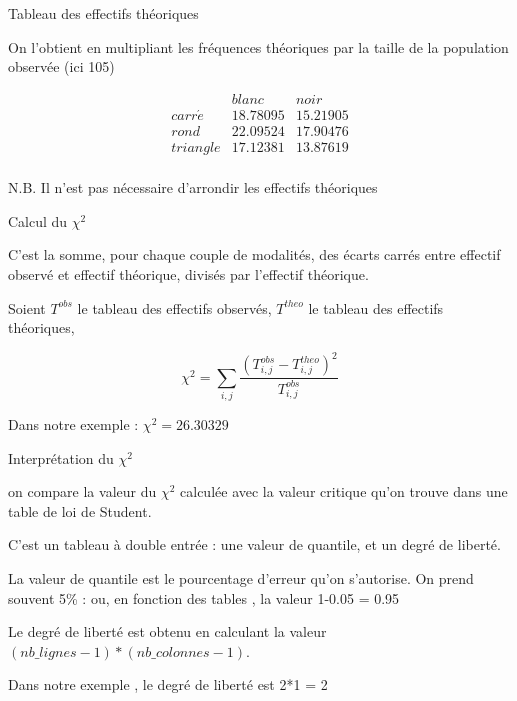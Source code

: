 \documentclass{beamer}
\begin{document}
\begin{frame}{ Tableau des effectifs théoriques}

On l'obtient en multipliant les fréquences théoriques par la taille de la population observée (ici 105)


$$\begin{array}{c|c|c}
   & blanc & noir \\ 
   \hline
carr\acute{e} &  18.78095 &  15.21905 \\ 
  \hline
  rond &   22.09524 & 17.90476    \\ 
    \hline
  triangle & 17.12381 & 13.87619   \\
  \end{array}$$

\begin{tiny}
N.B. Il n'est pas nécessaire d'arrondir les effectifs théoriques
\end{tiny}


\end{frame}


\begin{frame}{ Calcul du $\chi^2$ }

C'est la somme, pour chaque couple de modalités,  des écarts carrés entre effectif observé et effectif théorique, divisés par l'effectif théorique.

Soient $T^{obs}$ le tableau des effectifs observés, $T^{theo}$ le tableau des effectifs théoriques, 


$$\chi^2 =  \sum_{i,j}  \frac{( T^{obs}_{i,j} -  T^{theo}_{i,j})^2}{T^{obs}_{i,j}}$$       


\begin{tiny}
Dans notre exemple : $\chi^2 = 26.30329$
\end{tiny}
\end{frame}


\begin{frame}{ Interprétation du $\chi^2$ }

on compare la valeur du $\chi^2$ calculée avec la \alert{valeur critique} qu'on trouve   dans une \alert{table de loi de Student}.

C'est un tableau à double entrée : une \alert{valeur de quantile}, et un \alert{degré de liberté}.

La valeur de quantile est le pourcentage d'erreur qu'on s'autorise.  On prend souvent \alert{5\%} : ou, en fonction des tables , la valeur 1-0.05 =  0.95

Le degré de liberté est obtenu en calculant la valeur $(nb\_lignes - 1)*(nb\_colonnes -1)$.


\begin{tiny}
Dans notre exemple , le degré de liberté est 2*1 = 2
\end{tiny}

\end{frame}
\end{document}
